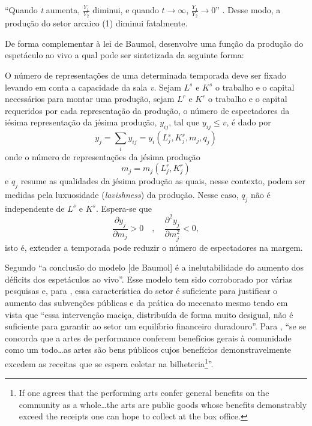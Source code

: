 \documentclass[a4paper, 12pt, openright, oneside, german, french, english, brazil, article]{abntex2}
\begin{document}
\begin{enumerate}
	``Quando \textit{t} aumenta, $\frac{Y_1}{Y_2}$ diminui, e quando $t \rightarrow \infty$, $\frac{Y_1}{Y_2} \rightarrow 0$'' \cite[p. 57]{benhamou2007economia}. Desse modo, a produção do setor arcaico (1) diminui fatalmente.
\end{enumerate}

De forma complementar à lei de Baumol,  desenvolve uma função da produção do espetáculo ao vivo a qual pode ser sintetizada da seguinte forma:

O número de representações de uma determinada temporada deve ser fixado levando em conta a capacidade da sala \textit{v}. Sejam $L^s$ e $K^s$ o trabalho e o capital necessários para montar uma produção, sejam $L^r$ e $K^r$ o trabalho e o capital requeridos por cada representação da produção, o número de espectadores da iésima representação da jésima produção, $y_{ij}$, tal que $y_{ij} \leq v$, é dado por
$$y_j = \sum_iy_{ij} = y_i(L^{s}_{j}, K^{s}_{j}, m_j, q_j) $$ onde
o número de representações da jésima produção $$m_j = m_j(L^{r}_{j}, K^{r}_{j})$$ e $q_j$ resume as qualidades da jésima produção as quais, nesse contexto, podem ser medidas pela luxuosidade (\textit{lavishness}) da produção. Nesse caso, $q_j$ não é independente de $L^s$ e $K^s$. Espera-se que $$\frac{\partial y_j}{\partial m_j} > 0 \quad, \quad \frac{\partial^2y_j}{\partial m^{2}_{j}} < 0,$$ isto é, extender a temporada pode reduzir o número de espectadores na margem.

Segundo  ``a conclusão do modelo [de Baumol] é a inelutabilidade do aumento dos déficits dos espetáculos ao vivo''. Esse modelo tem sido corroborado por várias pesquisas \cite[e.g.]{throsby1979economics,leroy1980economie,peacock1983inflation,baumol1984inflation,dias2011artes} e, para , essa característica do setor é suficiente para justificar o aumento das subvenções públicas e da prática do mecenato mesmo tendo em vista que ``essa intervenção maciça, distribuída de forma muito desigual, não é suficiente para garantir ao setor um equilíbrio financeiro duradouro''. Para , ``se se concorda que a artes de performance conferem benefícios gerais à comunidade como um todo\ldots as artes são bens públicos cujos benefícios demonstravelmente excedem as receitas que se espera coletar na bilheteria\footnote{If one agrees that the performing arts confer general benefits on the community as a whole\ldots the arts are public goods whose benefits demonstrably exceed the receipts one can hope to collect at the box office.}''.
\end{document}
